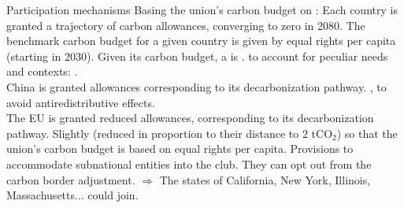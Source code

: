 \documentclass[aspectratio=169,xcolor=dvipsnames, 11pt,mathserif]{beamer}
\begin{document}
\begin{frame}{Participation mechanisms}
    \bbvsp 
    \ip Basing the union's carbon budget on :
    \bbvsp \ip Each country is granted a trajectory of carbon allowances, converging to zero in 2080.
        \ip The benchmark carbon budget for a given country is given by equal rights per capita (starting in 2030).
        \ip Given its carbon budget, a  is .
    \ee
    \ip {} to account for peculiar needs and contexts:
    \bbvsp \ip {}.
    \\ China is granted allowances corresponding to its decarbonization pathway.
    \ip {}, to avoid antiredistributive effects. 
    \\ The EU is granted reduced allowances, corresponding to its decarbonization pathway.
    \ip Slightly  (reduced in proportion to their distance to 2 tCO$_\text{2}$) so that the union's carbon budget is based on equal rights per capita.
        \ee
    \ip Provisions to accommodate subnational entities into the club.
    \bbvsp \ip They can opt out from the carbon border adjustment.
        \ip $\Rightarrow$ The states of California, New York, Illinois, Massachusetts... could join.%
        \ee
    \ee
\end{frame}
\end{document}
